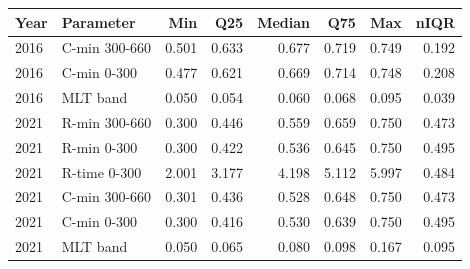 \begin{tabular}{@{}llrrrrrr@{}}
\toprule
Year & Parameter & Min & Q25 & Median & Q75 & Max & nIQR \\
\midrule
2016 & C-min 300-660 & 0.501 & 0.633 & 0.677 & 0.719 & 0.749 & 0.192 \\
2016 & C-min 0-300 & 0.477 & 0.621 & 0.669 & 0.714 & 0.748 & 0.208 \\
2016 & MLT band & 0.050 & 0.054 & 0.060 & 0.068 & 0.095 & 0.039 \\
2021 & R-min 300-660 & 0.300 & 0.446 & 0.559 & 0.659 & 0.750 & 0.473 \\
2021 & R-min 0-300 & 0.300 & 0.422 & 0.536 & 0.645 & 0.750 & 0.495 \\
2021 & R-time 0-300 & 2.001 & 3.177 & 4.198 & 5.112 & 5.997 & 0.484 \\
2021 & C-min 300-660 & 0.301 & 0.436 & 0.528 & 0.648 & 0.750 & 0.473 \\
2021 & C-min 0-300 & 0.300 & 0.416 & 0.530 & 0.639 & 0.750 & 0.495 \\
2021 & MLT band & 0.050 & 0.065 & 0.080 & 0.098 & 0.167 & 0.095 \\
\bottomrule
\end{tabular}
